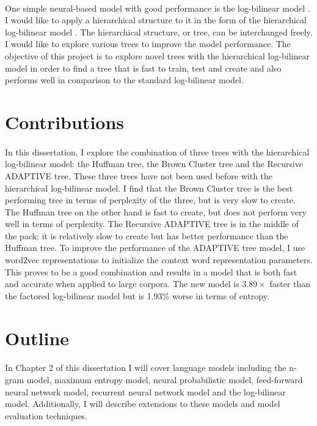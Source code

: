 \paragraph{}
One simple neural-based model with good performance is the log-bilinear model \cite{MnihHinton2007}. I would like to apply a hierarchical structure to it in the form of the hierarchical log-bilinear model \cite{MnihHinton2009}. The hierarchical structure, or tree, can be interchanged freely. I would like to explore various trees to improve the model performance. The objective of this project is to explore novel trees with the hierarchical log-bilinear model in order to find a tree that is fast to train, test and create and also performs well in comparison to the standard log-bilinear model.

\section{Contributions}
\paragraph{}
In this dissertation, I explore the combination of three trees with the hierarchical log-bilinear model: the Huffman tree, the Brown Cluster tree and the Recursive ADAPTIVE tree. These three trees have not been used before with the hierarchical log-bilinear model. I find that the Brown Cluster tree is the best performing tree in terms of perplexity of the three, but is very slow to create. The Huffman tree on the other hand is fast to create, but does not perform very well in terms of perplexity. The Recursive ADAPTIVE tree is in the middle of the pack; it is relatively slow to create but has better performance than the Huffman tree. To improve the performance of the ADAPTIVE tree model, I use word2vec representations to initialize the context word representation parameters. This proves to be a good combination and results in a model that is both fast and accurate when applied to large corpora. The new model is $3.89\times$ faster than the factored log-bilinear model but is 1.93\% worse in terms of entropy.

\section{Outline}
\paragraph{}
In Chapter 2 of this dissertation I will cover language models including the n-gram model, maximum entropy model, neural probabilistic model, feed-forward neural network model, recurrent neural network model and the log-bilinear model. Additionally, I will describe extensions to these models and model evaluation techniques.

